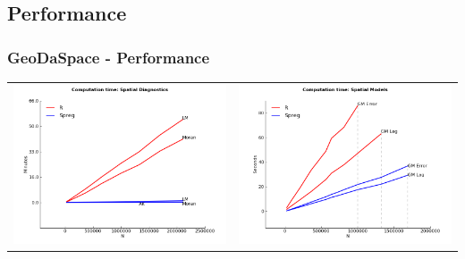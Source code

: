 \documentclass[nototal]{beamer}
\begin{document}
\subsection{Performance} 

\begin{frame}
	\frametitle{GeoDaSpace - Performance}
  \begin{table}
  \centering
  \begin{tabular}{c l}
   \includegraphics[scale=0.25]{figs/sp_diag.png}  &
   \includegraphics[scale=0.25]{figs/sp_error_lag.png} \\
  \end{tabular}
  \end{table}
  \begin{tiny}

\end{tiny}
\end{frame}
\end{document}
